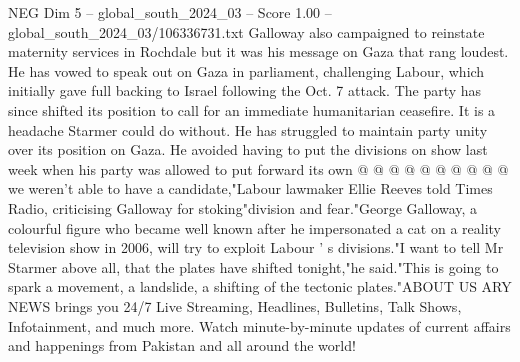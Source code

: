 \begin{textsample}{NEG Dim 5 – global\_south\_2024\_03 – Score 1.00 – global\_south\_2024\_03/106336731.txt}
Galloway also campaigned to reinstate maternity services in Rochdale but it was his message on Gaza that rang loudest.
He has vowed to speak out on Gaza in parliament, challenging Labour, which initially gave full backing to Israel following the Oct. 7 attack.
The party has since shifted its position to call for an immediate humanitarian ceasefire.
It is a headache Starmer could do without.
He has struggled to maintain party unity over its position on Gaza.
He avoided having to put the divisions on show last week when his party was allowed to put forward its own @ @ @ @ @ @ @ @ @ @ we weren't able to have a candidate,"Labour lawmaker Ellie Reeves told Times Radio, criticising Galloway for stoking"division and fear."George Galloway, a colourful figure who became well known after he impersonated a cat on a reality television show in 2006, will try to exploit Labour ' s divisions."I want to tell Mr Starmer above all, that the plates have shifted tonight,"he said."This is going to spark a movement, a landslide, a shifting of the tectonic plates."ABOUT US ARY NEWS brings you 24/7 Live Streaming, Headlines, Bulletins, Talk Shows, Infotainment, and much more.
Watch minute-by-minute updates of current affairs and happenings from Pakistan and all around the world!

\end{textsample}
